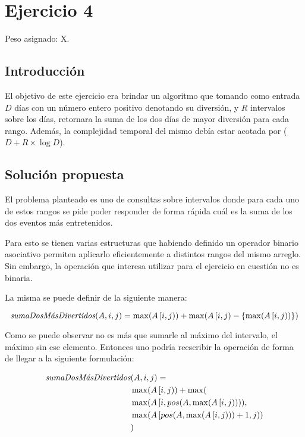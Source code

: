 \section{Ejercicio 4}

Peso asignado: X.

\subsection{Introducción}

El objetivo de este ejercicio era brindar un algoritmo que tomando como entrada
$D$ días con un número entero positivo denotando su diversión, y $R$ intervalos
sobre los días, retornara la suma de los dos días de mayor diversión para cada
rango. Además, la complejidad temporal del mismo debía estar acotada por
\ord($D + R \times \log{D}$).

\subsection{Solución propuesta}

El problema planteado es uno de consultas sobre intervalos donde para cada uno
de estos rangos se pide poder responder de forma rápida cuál es la suma de los
dos eventos más entretenidos.

Para esto se tienen varias estructuras que habiendo definido un operador binario
asociativo permiten aplicarlo eficientemente a distintos rangos del mismo
arreglo. Sin embargo, la operación que interesa utilizar para el ejercicio en
cuestión no es binaria.

La misma se puede definir de la siguiente manera:

\begin{equation*}
	\emph{sumaDosMásDivertidos}(A, i, j) = \max(A\left[i, j\right)) +
	\max(A\left[i, j\right) - \left\{\max(A\left[i, j\right))\right\})
\end{equation*}

Como se puede observar no es más que sumarle al máximo del intervalo, el máximo
sin ese elemento. Entonces uno podría reescribir la operación de forma de llegar
a la siguiente formulación:

\begin{align*}
	\emph{sumaDosMásDivertidos} & (A, i, j) = \\
	& \max(A\left[i, j\right)) + \max( \\
	& \max(A\left[i, pos(A, \max(A\left[i, j\right))\right)), \\
	& \max(A\left[pos(A, \max(A\left[i, j\right))) + 1, j\right)) \\
	& )
\end{align*}

